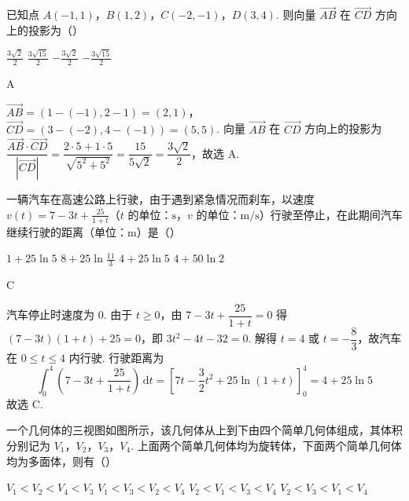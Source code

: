 \begin{problem}
已知点 \(A(-1,1)\)，\(B(1,2)\)，\(C(-2,-1)\)，\(D(3,4)\). 则向量 \(\overrightarrow{AB}\) 在 \(\overrightarrow{CD}\) 方向上的投影为（\quad）

\choices
    {\(\frac{3\sqrt{2}}{2}\)}
    {\(\frac{3\sqrt{15}}{2}\)}
    {\(-\frac{3\sqrt{2}}{2}\)}
    {\(-\frac{3\sqrt{15}}{2}\)}
\end{problem}

\begin{answer}
A
\end{answer}

\begin{solution}
\(\overrightarrow{AB}=(1-(-1),2-1)=(2,1)\)，\(\overrightarrow{CD}=(3-(-2),4-(-1))=(5,5)\).
向量 \(\overrightarrow{AB}\) 在 \(\overrightarrow{CD}\) 方向上的投影为
\(\dfrac{\overrightarrow{AB}\cdot\overrightarrow{CD}}{|\overrightarrow{CD}|}=\dfrac{2\cdot5+1\cdot5}{\sqrt{5^2+5^2}}=\dfrac{15}{5\sqrt{2}}=\dfrac{3\sqrt{2}}{2}\)，故选 A.
\end{solution}

\begin{problem}
一辆汽车在高速公路上行驶，由于遇到紧急情况而刹车，以速度 \(v(t) = 7 - 3t + \frac{25}{1 + t}\)（\(t\) 的单位：\(\mathrm{s}\)，\(v\) 的单位：\(\mathrm{m/s}\)）行驶至停止，在此期间汽车继续行驶的距离（单位：\(\mathrm{m}\)）是（\quad）

\choices
    {\(1 + 25\ln 5\)}
    {\(8 + 25\ln \frac{11}{3}\)}
    {\(4 + 25\ln 5\)}
    {\(4 + 50\ln 2\)}
\end{problem}

\begin{answer}
C
\end{answer}

\begin{solution}
汽车停止时速度为 \(0\). 由于 \(t\geqslant0\)，由
\(7-3t+\dfrac{25}{1+t}=0\) 得 \((7-3t)(1+t)+25=0\)，即 \(3t^2-4t-32=0\).
解得 \(t=4\) 或 \(t=-\dfrac{8}{3}\)，故汽车在 \(0\leqslant t\leqslant4\) 内行驶.
行驶距离为
\[
\int_0^4\left(7-3t+\frac{25}{1+t}\right)\,\mathrm{d}t
=\left[7t-\frac{3}{2}t^2+25\ln(1+t)\right]_0^4
=4+25\ln5
\]
故选 C.
\end{solution}

\begin{problem}
一个几何体的三视图如图所示，该几何体从上到下由四个简单几何体组成，其体积分别记为 \(V_{1}\)，\(V_{2}\)，\(V_{3}\)，\(V_{4}\). 上面两个简单几何体均为旋转体，下面两个简单几何体均为多面体，则有（\quad）

\FloatBarrier

\choices
    {\(V_{1} < V_{2} < V_{4} < V_{3}\)}
    {\(V_{1} < V_{3} < V_{2} < V_{4}\)}
    {\(V_{2} < V_{1} < V_{3} < V_{4}\)}
    {\(V_{2} < V_{3} < V_{1} < V_{4}\)}
\end{problem}

